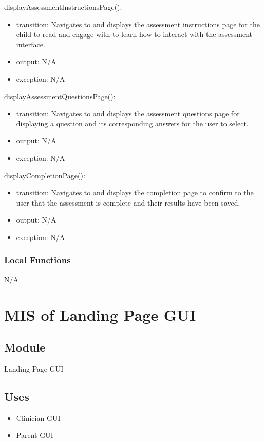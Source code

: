 \documentclass[12pt, titlepage]{article}
\begin{document}
\noindent displayAssessmentInstructionsPage():
\begin{itemize}
\item transition: Navigates to and displays the assessment instructions page for the child to read and engage with to learn how to interact with the assessment interface.
\item output: N/A
\item exception: N/A
\end{itemize}

\noindent displayAssessmentQuestionsPage():
\begin{itemize}
\item transition: Navigates to and displays the assessment questions page for displaying a question and its corresponding answers for the user to select.
\item output: N/A
\item exception: N/A
\end{itemize}

\noindent displayCompletionPage():
\begin{itemize}
\item transition: Navigates to and displays the completion page to confirm to the user that the assessment is complete and their results have been saved.
\item output: N/A
\item exception: N/A
\end{itemize}

\subsubsection{Local Functions}
N/A

\section{MIS of Landing Page GUI \label{mAppController} }

\subsection{Module}

Landing Page GUI

\subsection{Uses}

\begin{itemize}
  \item Clinician GUI
  \item Parent GUI
\end{itemize}
\end{document}
